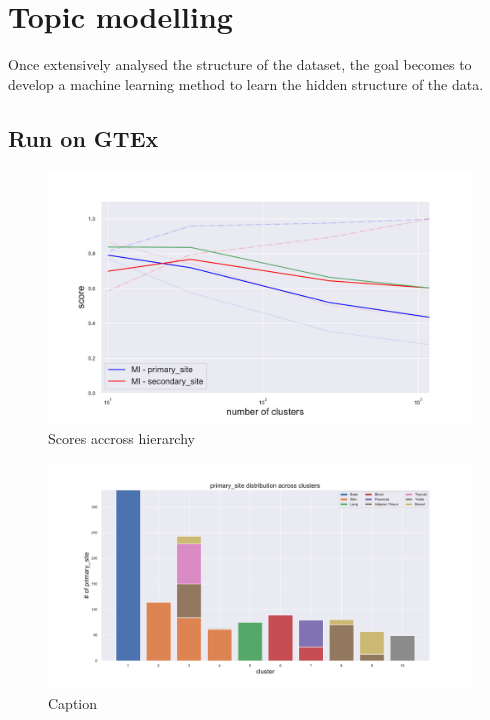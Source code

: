 \chapter{Topic modelling}\label{ch:topicmodelling}
Once extensively analysed the structure of the dataset, the goal becomes to develop a machine learning method to learn the hidden structure of the data.  






\section{Run on GTEx}
\begin{figure}[htb!]
    \centering
    \includegraphics[width=0.9\linewidth]{pictures/topic/gtex/oversigma_10tissue/metric_scores.pdf}
    \caption{Scores accross hierarchy}
    \label{fig:my_label}
\end{figure}

\begin{figure}[htb!]
    \centering
    \includegraphics[width=0.9\linewidth]{pictures/topic/gtex/oversigma_10tissue/clustercomposition_l3_primary_site.pdf}
    \caption{Caption}
    \label{fig:topic/gtex/oversigma_10tissue/clustercomposition_l2_primary_site}
\end{figure}

